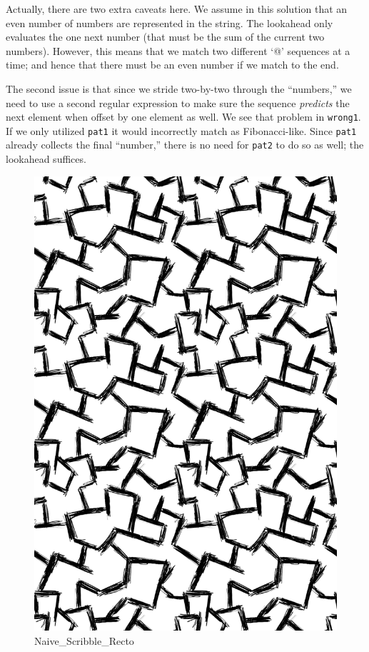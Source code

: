 Actually, there are two extra caveats here. We assume in this solution
that an even number of numbers are represented in the string. The
lookahead only evaluates the one next number (that must be the sum of
the current two numbers). However, this means that we match two
different `@' sequences at a time; and hence that there must be an even
number if we match to the end.

The second issue is that since we stride two-by-two through the
``numbers,'' we need to use a second regular expression to make sure the
sequence \emph{predicts} the next element when offset by one element as
well. We see that problem in \texttt{wrong1}. If we only utilized
\texttt{pat1} it would incorrectly match as Fibonacci-like. Since
\texttt{pat1} already collects the final ``number,'' there is no need
for \texttt{pat2} to do so as well; the lookahead suffices.

\begin{figure}
\centering
\includegraphics{images/Naive_Scribble_Recto.png}
\caption{Naive\_Scribble\_Recto}
\end{figure}

